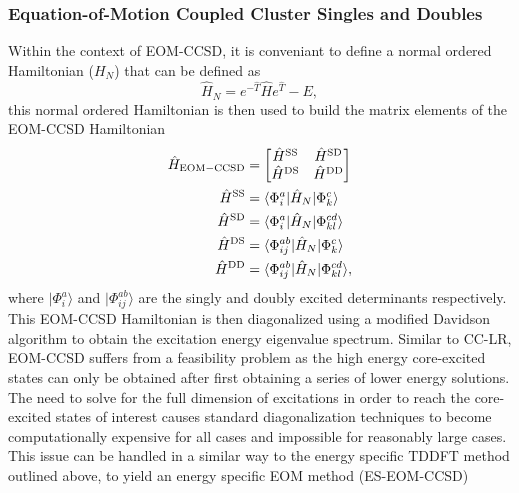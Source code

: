 \documentclass{article}
\begin{document}
\subsubsection{Equation-of-Motion Coupled Cluster Singles and Doubles}
Within the context of EOM-CCSD, it is conveniant to define a normal ordered Hamiltonian ($H_N$) that can be defined as
\begin{equation}
\hat{H}_N = e^{-\hat{T}}\hat{H}e^{\hat{T}} - E,
\end{equation}
this normal ordered Hamiltonian is then used to build the matrix elements of the EOM-CCSD Hamiltonian 
\begin{align}
\nonumber
\hat{H}_{\rm EOM-CCSD} &= 
\begin{bmatrix}
\hat{H}^{\rm SS} & \hat{H}^{\rm SD} \\
\hat{H}^{\rm DS} & \hat{H}^{\rm DD}
\end{bmatrix} \\
\nonumber
\hat{H}^{\rm SS} &= \langle \Phi_{i}^{a} | \hat{H}_N | \Phi_{k}^{c} \rangle \\
\nonumber
\hat{H}^{\rm SD} &= \langle \Phi_{i}^{a} | \hat{H}_N | \Phi_{kl}^{cd} \rangle \\
\nonumber
\hat{H}^{\rm DS} &= \langle \Phi_{ij}^{ab} | \hat{H}_N | \Phi_{k}^{c} \rangle \\
\hat{H}^{\rm DD} &= \langle \Phi_{ij}^{ab} | \hat{H}_N | \Phi_{kl}^{cd} \rangle,
\end{align}
where $|\Phi_{i}^{a} \rangle$ and $|\Phi_{ij}^{ab} \rangle$ are the singly and doubly excited determinants respectively. This EOM-CCSD Hamiltonian is then diagonalized using a modified Davidson algorithm to obtain the excitation energy eigenvalue spectrum. Similar to CC-LR, EOM-CCSD suffers from a feasibility problem as the high energy core-excited states can only be obtained after first obtaining a series of lower energy solutions. The need to solve for the full dimension of excitations in order to reach the core-excited states of interest causes standard diagonalization techniques to become computationally expensive for all cases and impossible for reasonably large cases. This issue can be handled in a similar way to the energy specific TDDFT method outlined above, to yield an energy specific EOM method (ES-EOM-CCSD)\cite{peng_energy-specific_2015}
\end{document}
